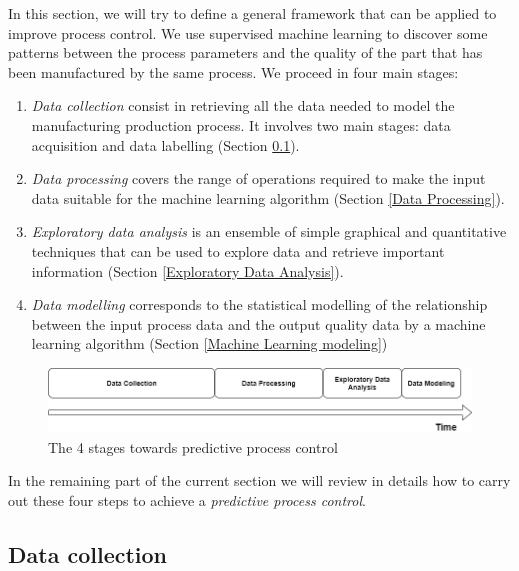 In this section, we will try to define a general framework that can be applied to improve process control. We use supervised machine learning to discover some patterns between the process parameters and the quality of the part that has been manufactured by the same process. We proceed in four main stages:
\begin{enumerate}
    \item \textit{Data collection} consist in retrieving all the data needed to model the manufacturing production process. It involves two main stages:  data acquisition and  data labelling (Section \ref{Data Collection}). 
    \item \textit{Data processing} covers the range of operations required to make the input data suitable for the machine learning algorithm (Section \ref{Data Processing}). 
    \item \textit{Exploratory data analysis} is an ensemble of simple graphical and quantitative techniques that can be used to explore data and retrieve important information (Section \ref{Exploratory Data Analysis}).
    \item \textit{Data modelling} corresponds to the statistical modelling of the relationship between the input process data and the output quality data by a machine learning algorithm (Section \ref{Machine Learning modeling})
\end{enumerate}
%
\begin{figure}
\centerline{\includegraphics[scale=0.45]{images/chapter_3/stages.png}}
\caption{The 4 stages towards predictive process control}
\label{fig:4_stages}
\end{figure}
%
In the remaining part of the current section we will review in details how to carry out these four steps to achieve a \textit{predictive process control}. 

\subsection{Data collection} \label{Data Collection}


